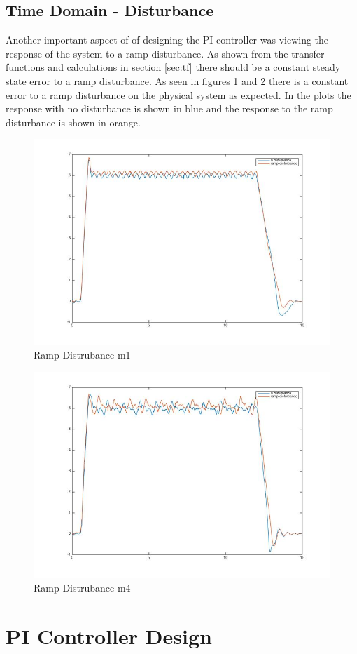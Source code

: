\documentclass[11pt,titlepage]{article}
\begin{document}
    \subsection{Time Domain - Disturbance} \label{sub:dist}
    Another important aspect of of designing the PI controller was viewing the response of the system to a ramp disturbance. As shown from the transfer functions and calculations in section \ref{sec:tf} there should be a constant steady state error to a ramp disturbance. As seen in figures \ref{fig:distm1} and \ref{fig:distm4} there is a constant error to a ramp disturbance on the physical system as expected. In the plots the response with no disturbance is shown in blue and the response to the ramp disturbance is shown in orange.
    \begin{figure}[H]
        \centering
        \includegraphics[scale=.5]{m1dist}
        \caption{Ramp Distrubance m1}
        \label{fig:distm1}
    \end{figure} 
    \begin{figure}[H]
        \centering
        \includegraphics[scale=.5]{m4dist}
        \caption{Ramp Distrubance m4}
        \label{fig:distm4}
    \end{figure} 

\section{PI Controller Design}
\end{document}
